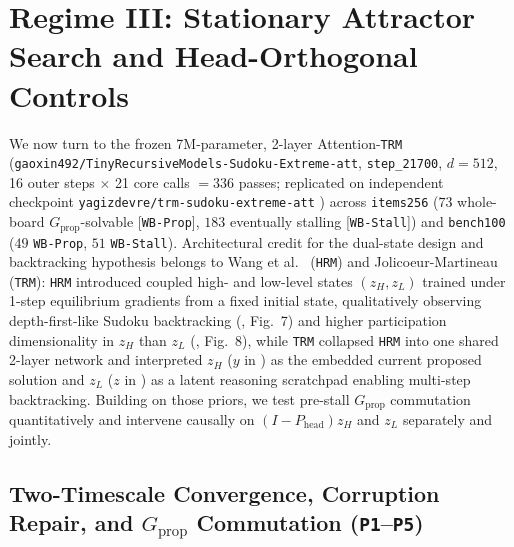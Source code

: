 \documentclass[10pt,letterpaper]{article}
\newcommand{\Gprop}{G_{\mathrm{prop}}}
\newcommand{\Phead}{P_{\mathrm{head}}}
\begin{document}
\section{Regime III: Stationary Attractor Search and Head-Orthogonal Controls}\label{sec:regime3}

We now turn to the frozen 7M-parameter, 2-layer Attention-\texttt{TRM} (\texttt{gaoxin492/\allowbreak TinyRecursiveModels-\allowbreak Sudoku-\allowbreak Extreme-\allowbreak att}, \texttt{step\_21700}, $d=512$, 16 outer steps $\times$ 21 core calls $= 336$ passes; replicated on independent checkpoint \texttt{yagizdevre/\allowbreak trm-\allowbreak sudoku-\allowbreak extreme-\allowbreak att} \cite{jolicoeur2025trm}) across \texttt{items256} ($73$ whole-board $\Gprop$-solvable [\texttt{WB-Prop}], $183$ eventually stalling [\texttt{WB-Stall}]) and \texttt{bench100} ($49$ \texttt{WB-Prop}, $51$ \texttt{WB-Stall}). Architectural credit for the dual-state design and backtracking hypothesis belongs to Wang et al.\ \cite{wang2025hrm} (\texttt{HRM}) and Jolicoeur-Martineau \cite{jolicoeur2025trm} (\texttt{TRM}): \texttt{HRM} introduced coupled high- and low-level states $(z_H, z_L)$ trained under 1-step equilibrium gradients from a fixed initial state, qualitatively observing depth-first-like Sudoku backtracking (\cite{wang2025hrm}, Fig.~7) and higher participation dimensionality in $z_H$ than $z_L$ (\cite{wang2025hrm}, Fig.~8), while \texttt{TRM} collapsed \texttt{HRM} into one shared 2-layer network and interpreted $z_H$ ($y$ in \cite{jolicoeur2025trm}) as the embedded current proposed solution and $z_L$ ($z$ in \cite{jolicoeur2025trm}) as a latent reasoning scratchpad enabling multi-step backtracking. Building on those priors, we test pre-stall $\Gprop$ commutation quantitatively and intervene causally on $(I-\Phead)z_H$ and $z_L$ separately and jointly.

\subsection{Two-Timescale Convergence, Corruption Repair, and \texorpdfstring{$\Gprop$}{G\_prop} Commutation (\texttt{P1}--\texttt{P5})}
\end{document}
